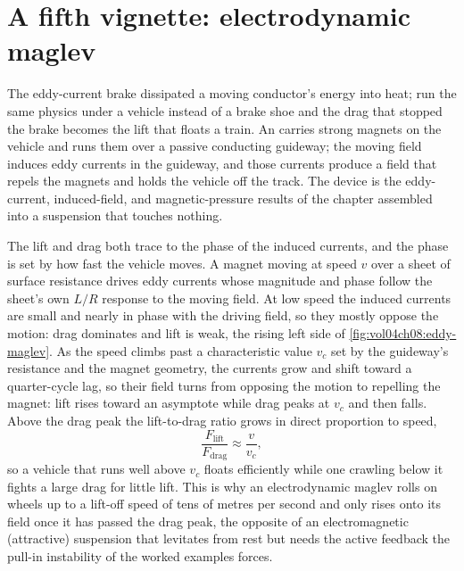 \section{A fifth vignette: electrodynamic maglev}

The eddy-current brake dissipated a moving conductor's energy into heat; run
the same physics under a vehicle instead of a brake shoe and the drag that
stopped the brake becomes the lift that floats a train. An
 carries strong magnets on the vehicle and runs
them over a passive conducting guideway; the moving field induces eddy currents
in the guideway, and those currents produce a field that repels the magnets and
holds the vehicle off the track. The device is the eddy-current, induced-field,
and magnetic-pressure results of the chapter assembled into a suspension that
touches nothing.

The lift and drag both trace to the phase of the induced currents, and the
phase is set by how fast the vehicle moves. A magnet moving at speed $v$ over
a sheet of surface resistance drives eddy currents whose magnitude and phase
follow the sheet's own $L/R$ response to the moving field. At low speed the
induced currents are small and nearly in phase with the driving field, so they
mostly oppose the motion: drag dominates and lift is weak, the rising left
side of \cref{fig:vol04ch08:eddy-maglev}. As the speed climbs past a
characteristic value $v_c$ set by the guideway's resistance and the magnet
geometry, the currents grow and shift toward a quarter-cycle lag, so their
field turns from opposing the motion to repelling the magnet: lift rises
toward an asymptote while drag peaks at $v_c$ and then falls. Above the drag
peak the lift-to-drag ratio grows in direct proportion to speed,
\[
\frac{F_{\text{lift}}}{F_{\text{drag}}} \approx \frac{v}{v_c},
\]
so a vehicle that runs well above $v_c$ floats efficiently while one crawling
below it fights a large drag for little lift. This is why an electrodynamic
maglev rolls on wheels up to a lift-off speed of tens of metres per second and
only rises onto its field once it has passed the drag peak, the opposite of an
electromagnetic (attractive) suspension that levitates from rest but needs the
active feedback the pull-in instability of the worked examples forces.



